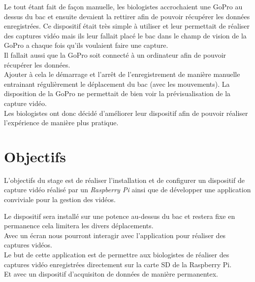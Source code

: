     \begin{flushleft}
        Le tout étant fait de façon manuelle, les biologistes accrochaient une GoPro au dessus du bac et ensuite devaient la rettirer afin de pouvoir récupérer les données enregistrées. Ce dispositif était très simple à utiliser et leur permettait de réaliser des captures vidéo mais ils leur fallait placé le bac dans le champ de vision de la GoPro a chaque fois qu'ils voulaient faire une capture.\\[0.2cm]
        
        Il fallait aussi que la GoPro soit connecté à un ordinateur afin de pouvoir récupérer les données.\\[0.2cm]

        Ajouter à cela le démarrage et l'arrêt de l'enregistrement de manière manuelle entrainant régulièrement le déplacement du bac (avec les mouvements). La disposition de la GoPro ne permettait de bien voir la prévisualisation de la capture vidéo.\\[0.2cm]

        Les biologistes ont donc décidé d'améliorer leur dispositif afin de pouvoir réaliser l'expérience de manière plus pratique.    
    \end{flushleft}

    \vspace{0.1cm}


    \section{Objectifs}
    L'objectifs du stage est de réaliser l'installation et de configurer un dispositif de capture vidéo réalisé par un \textit{Raspberry Pi} ainsi que de développer une application conviviale pour la gestion des vidéos.

    \vspace{0.1cm}

    \begin{flushleft}
        Le dispositif sera installé sur une potence au-dessus du bac et restera fixe en permanence cela limitera les divers déplacements.\\[0.2cm]                
    
        Avec un écran nous pourront interagir avec l'application pour réaliser des captures vidéos.\\[0.2cm]
    
        Le but de cette application est de permettre aux biologistes de réaliser des captures vidéo enregistrées directement sur la carte SD de la Raspberry Pi.\\[0.2cm]

        Et avec un dispositif d'acquisiton de données de manière permanentex.
    \end{flushleft}